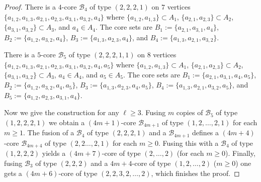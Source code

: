 \documentclass[10pt,a4paper]{amsart}
\def\cB{{\mathcal{B}}}
\begin{document}
\begin{proof}
There is a $4$-core $\cB_4$ of type $(2,2,2,1)$ on $7$ vertices $\{ a_{1,2}, a_{1,3}, a_{2,1}, a_{2,3}, a_{3,1}, a_{3,2}, a_4\}$ where
  $\{ a_{1,2}, a_{1,3}\}\subset A_1$,  $\{ a_{2,1}, a_{2,3}\}\subset A_2$, $\{a_{3,1}, a_{3,2}\}\subset A_3$, and $a_4\in A_4$.
The core sets are  $B_1:=\{ a_{2,1}, a_{3,1}, a_4\}$, $B_2:=\{ a_{1,2}, a_{3,2}, a_4\}$, $B_3:=\{ a_{1,3}, a_{2,3}, a_4\}$, and $B_4:=\{ a_{1,3}, a_{2,1}, a_{3,2}\}$.

There is a $5$-core $\cB_5$ of type $(2,2,2,1,1)$ on $8$ vertices $\{ a_{1,2}, a_{1,3}, a_{2,1}, a_{2,3}, a_{3,1}, a_{3,2}, a_4, a_5\}$ where
  $\{ a_{1,2}, a_{1,3}\}\subset A_1$,  $\{ a_{2,1}, a_{2,3}\}\subset A_2$, $\{a_{3,1}, a_{3,2}\}\subset A_3$, $a_4\in A_4$, and $a_5\in A_5$.
The core sets are  $B_1:=\{ a_{2,1}, a_{3,1}, a_4, a_5\}$, $B_2:=\{ a_{1,2}, a_{3,2}, a_4, a_5\}$, $B_3:=\{ a_{1,3}, a_{2,3}, a_4, a_5\}$, $B_4:=\{ a_{1,3}, a_{2,1}, a_{3,2}, a_5\}$, and $B_5:=\{ a_{1,2}, a_{2,3}, a_{3,1}, a_4\}$.

Now we give the construction for any $\ell \geq 3$. Fusing $m$ copies of $\cB_5$ of type $(1,2,2,2,1)$ we obtain a $(4m+1)$-core $\cB_{4m+1}$ of type $(1, 2, \dots, 2,1)$ for each $m\geq 1$.
The fusion of a $\cB_4$ of type $(2,2,2,1)$ and a $\cB_{4m+1}$ defines a $(4m+4)$-core
  $\cB_{4m+4}$ of type $(2,2\dots, 2, 1)$ for each $m\geq 0$.
Fusing this with a $\cB_4$ of type $(1,2,2,2)$ yields a $(4m+7)$-core of type $(2,\dots, 2)$ (for each $m\geq 0$).
Finally, fusing $\cB_3$ of type $(2,2,2)$ and a  ${4m+4}$-core of type $(1,2, \dots, 2)$ ($m\geq 0$) one gets a
 $(4m+6)$-core of type $(2,2,3,2,\dots, 2)$, which finishes the proof.
\end{proof}
\end{document}
